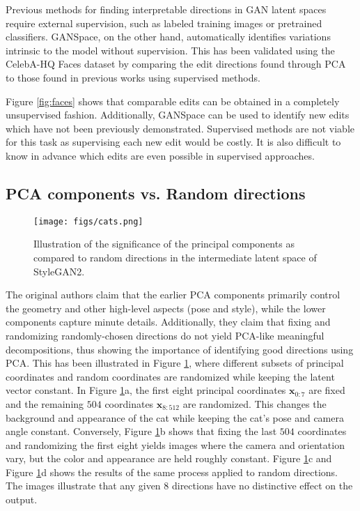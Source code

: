 Previous methods for finding interpretable directions in GAN latent spaces require external supervision, such as labeled training images or pretrained classifiers. GANSpace, on the other hand, automatically identifies variations intrinsic to the model without supervision. This has been validated using the CelebA-HQ Faces dataset by comparing the edit directions found through PCA to those found in previous works using supervised methods.

Figure \ref{fig:faces} shows that comparable edits can be obtained in a completely unsupervised fashion. Additionally, GANSpace can be used to identify new edits which have not been previously demonstrated. Supervised methods are not viable for this task as supervising each new edit would be costly. It is also difficult to know in advance which edits are even possible in supervised approaches.

\subsection{PCA components vs. Random directions}

\begin{figure}[H]
    \centering
    \texttt{[image: figs/cats.png]}
    \caption{Illustration of the significance of the principal components as compared to random directions in the intermediate latent space of StyleGAN2.}
    \label{fig:cats}
\end{figure}

The original authors claim that the earlier PCA components primarily control the geometry and other high-level aspects (pose and style), while the lower components capture minute details. Additionally, they claim that fixing and randomizing randomly-chosen directions do not yield PCA-like meaningful decompositions, thus showing the importance of identifying good directions using PCA. This has been illustrated in Figure \ref{fig:cats}, where different subsets of principal coordinates and random coordinates are randomized while keeping the latent vector constant. In Figure \ref{fig:cats}a, the first eight principal coordinates $\textbf{x}_{0:7}$ are fixed and the remaining $504$ coordinates $\textbf{x}_{8:512}$ are randomized. This changes the background and appearance of the cat while keeping the cat's pose and camera angle constant. Conversely, Figure \ref{fig:cats}b shows that fixing the last $504$ coordinates and randomizing the first eight yields images where the camera and orientation vary, but the color and appearance are held roughly constant. Figure \ref{fig:cats}c and Figure \ref{fig:cats}d shows the results of the same process applied to random directions. The images illustrate that any given $8$ directions have no distinctive effect on the output.

